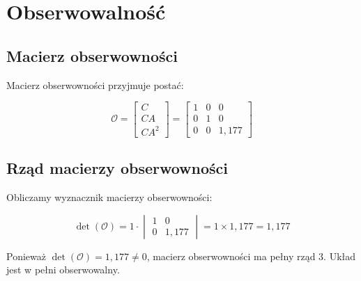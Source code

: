 \section{Obserwowalność}

\subsection{Macierz obserwowności}

Macierz obserwowności przyjmuje postać:

\begin{equation}
\mathcal{O} = \begin{bmatrix} C \\ CA \\ CA^2 \end{bmatrix} = \begin{bmatrix} 1 & 0 & 0 \\ 0 & 1 & 0 \\ 0 & 0 & 1{,}177 \end{bmatrix}
\end{equation}

\subsection{Rząd macierzy obserwowności}

Obliczamy wyznacznik macierzy obserwowności:

\begin{equation}
\det(\mathcal{O}) = 1 \cdot \begin{vmatrix} 1 & 0 \\ 0 & 1{,}177 \end{vmatrix} = 1 \times 1{,}177 = 1{,}177
\end{equation}

Ponieważ $\det(\mathcal{O}) = 1{,}177 \neq 0$, macierz obserwowności ma pełny rząd 3. Układ jest w pełni obserwowalny.


